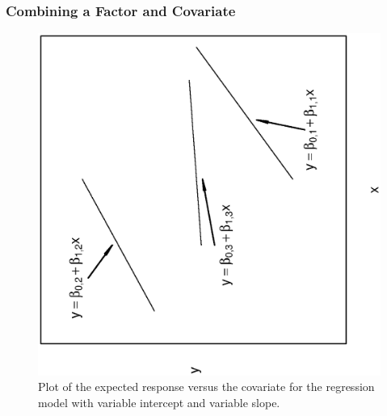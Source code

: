 \begin{frame}%
\frametitle{Combining a Factor and Covariate}
\begin{figure}[htp]
  \begin{center}
    \includegraphics[width=1\textwidth,angle=270,scale=0.5]{Chapter4/F4TheoryVarIntVarSlope.ps}
    \caption{\label{F4:TheoryVarIntVarSlope} \small  Plot of the expected response versus the covariate for the regression model
with variable intercept and variable slope.}
  \end{center}
\end{figure}
\end{frame}


